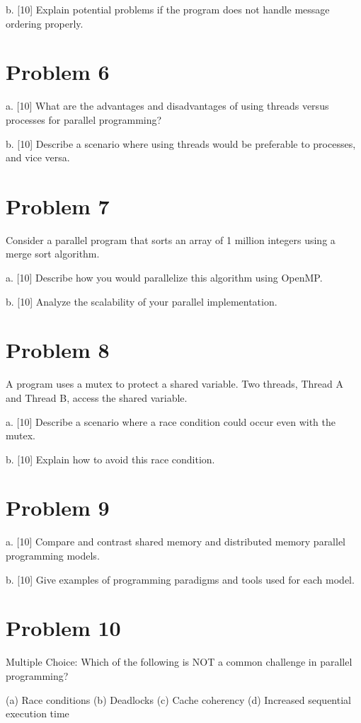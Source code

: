 \documentclass{article}
\begin{document}
b. [10] Explain potential problems if the program does not handle message ordering properly.


\section*{Problem 6}
a. [10] What are the advantages and disadvantages of using threads versus processes for parallel programming?

b. [10] Describe a scenario where using threads would be preferable to processes, and vice versa.


\section*{Problem 7}
Consider a parallel program that sorts an array of 1 million integers using a merge sort algorithm.

a. [10] Describe how you would parallelize this algorithm using OpenMP.

b. [10] Analyze the scalability of your parallel implementation.


\section*{Problem 8}
A program uses a mutex to protect a shared variable.  Two threads, Thread A and Thread B, access the shared variable.

a. [10] Describe a scenario where a race condition could occur even with the mutex.

b. [10] Explain how to avoid this race condition.


\section*{Problem 9}
a. [10]  Compare and contrast shared memory and distributed memory parallel programming models.

b. [10]  Give examples of programming paradigms and tools used for each model.


\section*{Problem 10}
Multiple Choice: Which of the following is NOT a common challenge in parallel programming?

(a) Race conditions
(b) Deadlocks
(c) Cache coherency
(d) Increased sequential execution time
\end{document}
